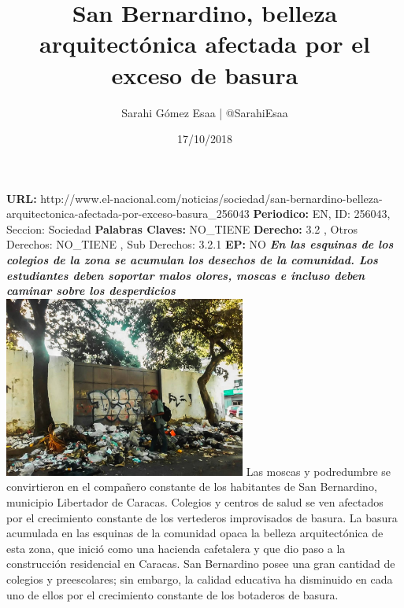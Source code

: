 \documentclass{article}%
\title{\textbf{San Bernardino, belleza arquitectónica afectada por el exceso de basura}}%
\author{Sarahi Gómez Esaa | @SarahiEsaa}%
\date{17/10/2018}%
\begin{document}
%
\normalsize%
\maketitle%
\textbf{URL: }%
http://www.el{-}nacional.com/noticias/sociedad/san{-}bernardino{-}belleza{-}arquitectonica{-}afectada{-}por{-}exceso{-}basura\_256043\newline%
%
\textbf{Periodico: }%
EN, %
ID: %
256043, %
Seccion: %
Sociedad\newline%
%
\textbf{Palabras Claves: }%
NO\_TIENE\newline%
%
\textbf{Derecho: }%
3.2%
, Otros Derechos: %
NO\_TIENE%
, Sub Derechos: %
3.2.1%
\newline%
%
\textbf{EP: }%
NO\newline%
\newline%
%
\textbf{\textit{En las esquinas de los colegios de la zona se acumulan los desechos de la comunidad. Los estudiantes deben soportar malos olores, moscas e incluso deben caminar sobre los desperdicios~}}%
\newline%
\newline%
%
\includegraphics[width=300px]{186.jpg}%
\newline%
%
Las moscas y podredumbre se convirtieron en el compañero constante de los habitantes de San Bernardino, municipio Libertador de Caracas. Colegios y centros de salud se ven afectados por el crecimiento constante de los vertederos improvisados de basura.%
\newline%
%
La basura acumulada en las esquinas de la comunidad opaca la belleza arquitectónica de esta zona, que inició como una hacienda cafetalera y que dio paso a la construcción residencial en Caracas.%
\newline%
%
San Bernardino posee una gran cantidad de colegios y preescolares; sin embargo, la calidad educativa ha disminuido en cada uno de ellos por el crecimiento constante de los botaderos de basura.%
\newline%
\end{document}

